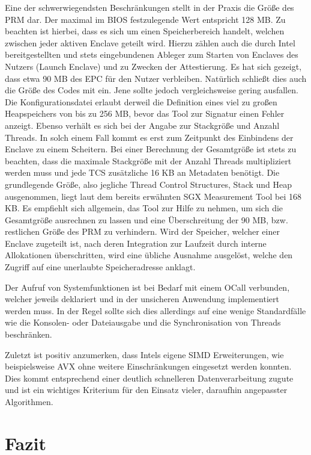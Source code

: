 Eine der schwerwiegendsten Beschränkungen stellt in der Praxis die Größe des \ac{PRM} dar. Der maximal im \ac{BIOS} festzulegende Wert entspricht 128 MB. Zu beachten ist hierbei, dass es sich um einen Speicherbereich handelt, welchen zwischen jeder aktiven Enclave geteilt wird. Hierzu zählen auch die durch Intel bereitgestellten und stets eingebundenen Ableger zum Starten von Enclaves des Nutzers (Launch Enclave) und zu Zwecken der Attestierung. Es hat sich gezeigt, dass etwa 90 MB des \ac{EPC} für den Nutzer verbleiben. Natürlich schließt dies auch die Größe des Codes mit ein. Jene sollte jedoch vergleichsweise gering ausfallen. Die Konfigurationsdatei erlaubt derweil die Definition eines viel zu großen Heapspeichers von bis zu 256 MB, bevor das Tool zur Signatur einen Fehler anzeigt. Ebenso verhält es sich bei der Angabe zur Stackgröße und Anzahl Threads. In solch einem Fall kommt es erst zum Zeitpunkt des Einbindens der Enclave zu einem Scheitern. Bei einer Berechnung der Gesamtgröße ist stets zu beachten, dass die maximale Stackgröße mit der Anzahl Threads multipliziert werden muss und jede \ac{TCS} zusätzliche 16 KB an Metadaten benötigt. Die grundlegende Größe, also jegliche Thread Control Structures, Stack und Heap ausgenommen, liegt laut dem bereits erwähnten \ac{SGX} Measurement Tool bei 168 KB. Es empfiehlt sich allgemein, das Tool zur Hilfe zu nehmen, um sich die Gesamtgröße ausrechnen zu lassen und eine Überschreitung der 90 MB, bzw. restlichen Größe des \ac{PRM} zu verhindern. Wird der Speicher, welcher einer Enclave zugeteilt ist, nach deren Integration zur Laufzeit durch interne Allokationen überschritten, wird eine übliche Ausnahme ausgelöst, welche den Zugriff auf eine unerlaubte Speicheradresse anklagt.

Der Aufruf von Systemfunktionen ist bei Bedarf mit einem \ac{OCall} verbunden, welcher jeweils deklariert und in der unsicheren Anwendung implementiert werden muss. In der Regel sollte sich dies allerdings auf eine wenige Standardfälle wie die Konsolen- oder Dateiausgabe und die Synchronisation von Threads beschränken.

Zuletzt ist positiv anzumerken, dass Intels eigene \ac{SIMD} Erweiterungen, wie beispielsweise \ac{AVX} ohne weitere Einschränkungen eingesetzt werden konnten. Dies kommt entsprechend einer deutlich schnelleren Datenverarbeitung zugute und ist ein wichtiges Kriterium für den Einsatz vieler, daraufhin angepasster Algorithmen.

\section{Fazit}

